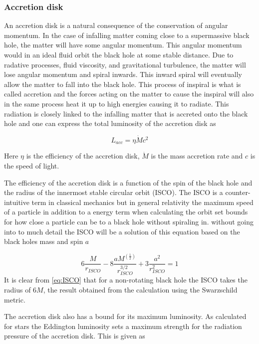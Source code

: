 \documentclass{article}
\begin{document}
\subsubsection{Accretion disk}
An accretion disk is a natural consequence of the conservation of angular momentum. In the case of infalling 
matter coming close to a supermassive black hole, the matter will have some angular momentum. This angular momentum would in an ideal fluid orbit the black hole at some stable distance. Due to radative processes, fluid viscosity, and gravitational turbulence, 
the matter will lose angular momentum and spiral inwards. This inward spiral will eventually allow the matter to fall into the black hole. 
This process of inspiral is what is called accretion and the forces acting on the matter to cause the inspiral 
will also in the same process heat it up to high energies causing it to radiate. This radiation is closely linked to the 
infalling matter that is accreted onto the black hole and one can express the total luminosity of the accretion disk as 

\begin{equation}
    L_{acc} = \eta \dot{M}c^2
    \label{eq:accretion_luminosity}
\end{equation}

Here $\eta$ is the efficiency of the accretion disk, $\dot{M}$ is the mass accretion rate and $c$ is the speed of light.

The efficiency of the accretion disk is a function of the spin of the black hole and the radius of the innermost stable circular orbit (ISCO).
The ISCO is a counter-intuitive term in classical mechanics but in general relativity the maximum speed of a particle 
in addition to a energy term when calculating the orbit set bounds for how close a particle can be to 
a black hole without spiraling in. without going into to much detail the ISCO will be a solution of this equation based on the black holes mass and spin $a$

\begin{equation}
    6\frac{M}{r_{ISCO}}-8\frac{aM^(\frac{1}{2})}{r^{3/2}_{ISCO}}+3\frac{a^2}{r_{ISCO}^2} = 1
    \label{eq:ISCO}
\end{equation}
It is clear from \ref{eq:ISCO} that for a non-rotating black hole the ISCO takes the radius of $6M$, the result obtained from the calculation using the Swarzschild metric.


The accretion disk also has a bound for its maximum luminosity. As calculated for stars the Eddington
luminosity sets a maximum strength for the radiation pressure of the accretion disk. This is given as
\end{document}
